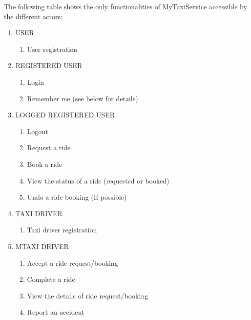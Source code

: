 \documentclass[11pt]{article} %
\begin{document}
      The following table shows the only functionalities of MyTaxiService accessible by
      the different actors:
      \begin{enumerate}
	      \item USER
		\begin{enumerate}
		      \item User registration
		\end{enumerate}
	
	      \item REGISTERED USER
		\begin{enumerate}
		      \item Login
		      \item Remember me (see below for details)
		\end{enumerate}
	
	      \item LOGGED REGISTERED USER
		\begin{enumerate}
		      \item Logout
		      \item Request a ride
		      \item Book a ride
		      \item View the status of a ride (requested or booked)
		      \item Undo a ride booking (If possible)
		\end{enumerate}
	
	
	      \item TAXI DRIVER
		\begin{enumerate}
		      \item Taxi driver registration
		\end{enumerate}
	
	      \item MTAXI DRIVER
		\begin{enumerate}
		      \item Accept a ride request/booking
		      \item Complete a ride
		      \item View the details of ride request/booking
		      \item Report an accident
		\end{enumerate}
	

\end{enumerate}
\end{document}
